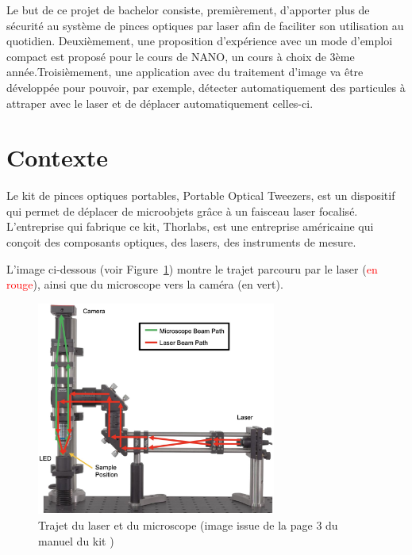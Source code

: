 Le but de ce projet de bachelor consiste, premièrement, d'apporter plus de sécurité au système de pinces optiques par laser afin de faciliter son utilisation au quotidien. Deuxièmement, une proposition d'expérience avec un mode d'emploi compact est proposé pour le cours de NANO, un cours à choix de 3ème année.Troisièmement, une application avec du traitement d'image va être développée pour pouvoir, par exemple, détecter automatiquement des particules à attraper avec le laser et de déplacer automatiquement celles-ci.
\newpage
\section{Contexte}

Le kit de pinces optiques portables, Portable Optical Tweezers, est un dispositif qui permet de déplacer de microobjets grâce à un faisceau laser focalisé. L'entreprise qui fabrique ce kit, Thorlabs, est une entreprise américaine qui conçoit des composants optiques, des lasers, des instruments de mesure.

L'image ci-dessous (voir Figure~\ref{chemin_laser_caméra}) montre le trajet parcouru par le laser (\textcolor{red}{en rouge}), ainsi que du microscope vers la caméra (\textcolor[RGB]{0, 120, 0}{en vert}).
\begin{figure}[H]
    \begin{center}
        \includegraphics[width=0.7\textwidth]{assets/figures/Introduction/chemin_laser_camera.jpeg}
    \end{center}
    \caption{Trajet du laser et du microscope (image issue de la page 3 du manuel du kit \cite{manualPortableOpticalTweezers})}
    \label{chemin_laser_caméra}
\end{figure}

